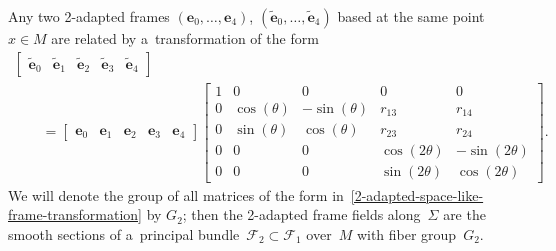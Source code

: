 \documentclass[pdftex]{sigma}
\numberwithin{equation}{section}
\theoremstyle{definition}
\begin{document}
Any two 2-adapted frames $(\mathbf{e}_0, \ldots, \mathbf{e}_4)$, $(\tilde{\mathbf{e}}_0, \ldots, \tilde{\mathbf{e}}_4)$
based at the same point $x \in M$ are related by a~transformation of the form
\begin{gather}
\begin{bmatrix}
\tilde{\mathbf{e}}_0 & \tilde{\mathbf{e}}_1 & \tilde{\mathbf{e}}_2 & \tilde{\mathbf{e}}_3 & \tilde{\mathbf{e}}_4
\end{bmatrix}
\nonumber
\\
\qquad{}
=
\begin{bmatrix}
\mathbf{e}_0 & \mathbf{e}_1 & \mathbf{e}_2 & \mathbf{e}_3 & \mathbf{e}_4
\end{bmatrix}
\begin{bmatrix}
1 & 0 & 0 & 0 & 0
\\
0 & \cos(\theta) & -\sin(\theta) & r_{13} & r_{14}
\\
0 & \sin(\theta) & \cos(\theta) & r_{23} & r_{24}
\\
0 & 0 & 0 & \cos(2\theta) & -\sin(2\theta)
\\
0 & 0 & 0 & \sin(2\theta) & \cos(2\theta)
\end{bmatrix}.
\label{2-adapted-space-like-frame-transformation}
\end{gather}
We will denote the group of all matrices of the form in~\eqref{2-adapted-space-like-frame-transformation} by $G_2$; then
the 2-adapted frame f\/ields along~$\Sigma$ are the smooth sections of a~principal bundle~$\mathcal{F}_2 \subset
\mathcal{F}_1$ over~$M$ with f\/iber group~$G_2$.
\end{document}
